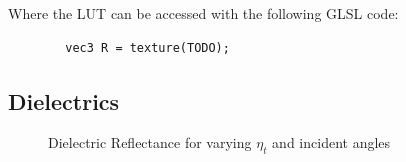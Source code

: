 \documentclass[12pt,letterpaper]{article}
\begin{document}
Where the LUT can be accessed with the following GLSL code:

\begin{tcolorbox}[colback=white]
	\begin{lstlisting}
		vec3 R = texture(TODO);
	\end{lstlisting}
\end{tcolorbox}

\newpage

\subsection{Dielectrics}

\begin{figure}[htbp]
    \centering
    \caption{Dielectric Reflectance for varying $\eta_t$ and incident angles}
    \label{fig:dielectric_fresnel}
\end{figure}
\end{document}

